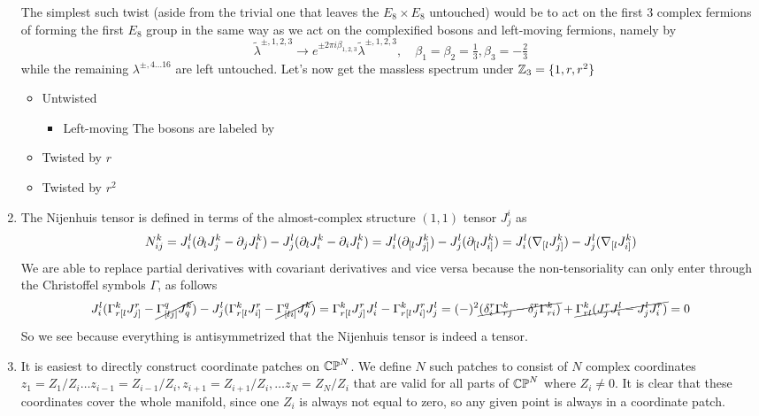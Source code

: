 \documentclass[11pt, class=article, crop=false]{standalone}
\begin{document}
\begin{enumerate}
	The simplest such twist (aside from the trivial one that leaves the $E_8 \times E_8$ untouched) would be to act on the first 3 complex fermions of forming the first $E_8$ group in the same way as we act on the complexified bosons and left-moving fermions, namely by
	\[
		\tilde \lambda^{\pm, 1,2,3} \to e^{\pm 2\pi i \beta_{1,2,3}} \tilde \lambda^{\pm, 1,2,3}, \quad \beta_1 = \beta_2 = \tfrac13, \beta_3 = -\tfrac23
	\]
	while the remaining $\lambda^{\pm, 4\dots 16}$ are left untouched. Let's now get the massless spectrum under $\mathbb{Z}_3 = \{1, r, r^2\}$
	\begin{itemize}
		\item Untwisted
		\begin{itemize}
			 \item Left-moving
			 The bosons are labeled by
		\end{itemize}
			
			
			
		
		\item Twisted by $r$
		
		\item Twisted by $r^2$
	\end{itemize}
	
	\item The Nijenhuis tensor is defined in terms of the almost-complex structure $(1,1)$ tensor $J^i_j$ as
	\[
		N_{ij}^k = J^l_i (\partial_{l} J^k_{j} - \partial_j J^k_l) - J_{j}^l (\partial_l J^k_i - \partial_i J^k_l)
		 = J^l_i (\partial_{[l} J^k_{j]}) - J_{j}^l (\partial_{[l} J^k_{i]}) = J^l_i (\nabla_{[l} J^k_{j]}) - J_{j}^l (\nabla_{[l} J^k_{i]})
	\]
	We are able to replace partial derivatives with covariant derivatives and vice versa because the non-tensoriality can only enter through the Christoffel symbols $\Gamma$, as follows
	\[
		J^l_i (\Gamma_{r[l}^k J_{j]}^r - \cancel{\Gamma_{[lj]}^q J_q^k} ) - J^l_j (\Gamma_{r[l}^k J_{i]}^r - \cancel{\Gamma_{[li]}^q J_q^k} ) =  \Gamma_{r[l}^k J_{j]}^r J^l_i - \Gamma_{r[l}^k J_{i]}^r  J^l_j = (-)^2 \cancel{(\delta^r_i \Gamma^k_{rj}  - \delta^r_j \Gamma^k_{ri})} + \cancel{\Gamma_{rl}^k (J^r_j J^l_i - J^l_j J^r_i)} =0
	\]
	So we see because everything is antisymmetrized that the Nijenhuis tensor is indeed a tensor. 
	
	
	\item It is easiest to directly construct coordinate patches on $\mathbb{CP}^N$. We define $N$ such patches to consist of $N$ complex coordinates $z_1 = Z_1/Z_i \dots z_{i-1} = Z_{i-1}/Z_{i}, z_{i+1} = Z_{i+1}/Z_i, \dots z_N = Z_N/Z_i$ that are valid for all parts of $\mathbb{CP}^N$ where $Z_i \neq 0$. It is clear that these coordinates cover the whole manifold, since one $Z_i$ is always not equal to zero, so any given point is always in a coordinate patch. 
	

\end{enumerate}
\end{document}
